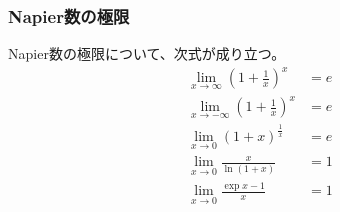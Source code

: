 \documentclass[dvipdfmx]{jsarticle}
\begin{document}
\subsubsection{Napier数の極限}%
\begin{thm}\label{4.3.3.24} Napier数の極限について、次式が成り立つ。
\begin{align*}
\lim_{x \rightarrow \infty}\left( 1 + \frac{1}{x} \right)^{x} &= e\\
\lim_{x \rightarrow - \infty}\left( 1 + \frac{1}{x} \right)^{x} &= e\\
\lim_{x \rightarrow 0}(1 + x)^{\frac{1}{x}} &= e\\
\lim_{x \rightarrow 0}\frac{x}{\ln(1 + x)} &= 1\\
\lim_{x \rightarrow 0}\frac{\exp x - 1}{x} &= 1
\end{align*}
\end{thm}
\end{document}
